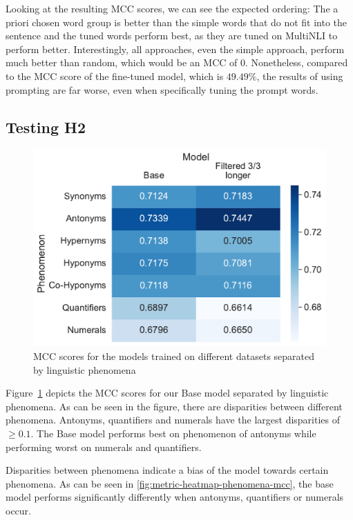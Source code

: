 Looking at the resulting \ac{MCC} scores, we can see the expected ordering: The a priori chosen word group is better than the simple words that do not fit into the sentence and the tuned words perform best, as they are tuned on \ac{MultiNLI} to perform better. Interestingly, all approaches, even the simple approach, perform much better than random, which would be an \ac{MCC} of $0$. Nonetheless, compared to the \ac{MCC} score of the fine-tuned model, which is $49.49\%$, the results of using prompting are far worse, even when specifically tuning the prompt words.

\subsection{Testing H2}
\begin{figure}[ht]
    \centering
    \includegraphics[width=0.9\columnwidth]{./images/metric_heatmaps_phenomena/all_words/matthews_correlation.pdf}
    \caption{\ac{MCC} scores for the models trained on different datasets separated by linguistic phenomena}
    \label{fig:metric-heatmap-phenomena-mcc}
\end{figure}

Figure~\ref{fig:metric-heatmap-phenomena-mcc} depicts the \acs{MCC} scores for our Base model separated by linguistic phenomena. As can be seen in the figure, there are disparities between different phenomena. Antonyms, quantifiers and numerals have the largest disparities of $\geq 0.1$. The Base model performs best on phenomenon of antonyms while performing worst on numerals and quantifiers.

Disparities between phenomena indicate a bias of the model towards certain phenomena. As can be seen in \autoref{fig:metric-heatmap-phenomena-mcc}, the base model performs significantly differently when antonyms, quantifiers or numerals occur.

